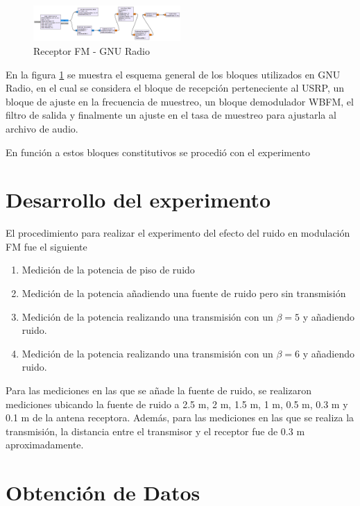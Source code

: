 \documentclass[conference]{IEEEtran}
\begin{document}
	\begin{figure}[h]
		\centering
		\includegraphics[width=0.5\textwidth]{media/receptor-fm}
		\caption{Receptor FM - GNU Radio}
		\label{fig:receptor-fm}
	\end{figure}
	
	En la figura \ref{fig:receptor-fm} se muestra el esquema general de los bloques utilizados en GNU Radio, en el cual se considera el bloque de recepción perteneciente al USRP, un bloque de ajuste en la frecuencia de muestreo, un bloque demodulador WBFM, el filtro de salida y finalmente un ajuste en el tasa de muestreo para ajustarla al archivo de audio.
	
	En función a estos bloques constitutivos se procedió con el experimento
	
	\section{Desarrollo del experimento}
	
	El procedimiento para realizar el experimento del efecto del ruido en modulación FM fue el siguiente
	
	\begin{enumerate}
		\item Medición de la potencia de piso de ruido
		\item Medición de la potencia añadiendo una fuente de ruido pero sin transmisión
		\item Medición de la potencia realizando una transmisión con un $\beta=5$ y añadiendo ruido.
		\item Medición de la potencia realizando una transmisión con un $\beta=6$ y añadiendo ruido.
	\end{enumerate}
	
	Para las mediciones en las que se añade la fuente de ruido, se realizaron mediciones ubicando la fuente de ruido a 2.5 m, 2 m, 1.5 m, 1 m, 0.5 m, 0.3 m y 0.1 m de la antena receptora. Además, para las mediciones en las que se realiza la transmisión, la distancia entre el transmisor y el receptor fue de 0.3 m aproximadamente.
	
	\section{Obtención de Datos}
	
\end{document}
